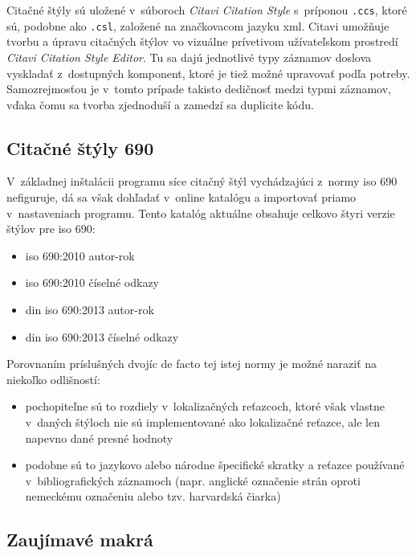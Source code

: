 \documentclass[
  color,
  table,
  nolof,
  oneside,
]{fithesis3}
\begin{document}
Citačné štýly sú uložené v~súboroch \emph{Citavi Citation Style} s~príponou \texttt{.ccs}, ktoré sú, podobne ako \texttt{.csl}, založené na značkovacom jazyku \gls{xml}. Citavi umožňuje tvorbu a úpravu citačných štýlov vo vizuálne prívetivom užívateľskom prostredí \emph{Citavi Citation Style Editor}. Tu sa dajú jednotlivé typy záznamov doslova vyskladať z~dostupných komponent, ktoré je tiež možné upravovať podľa potreby. Samozrejmosťou je v~tomto prípade takisto dedičnosť medzi typmi záznamov, vďaka čomu sa tvorba zjednoduší a zamedzí sa duplicite kódu.

\subsection{Citačné štýly  690}

V~základnej inštalácii programu síce citačný štýl vychádzajúci z~normy \gls{iso} 690 nefiguruje, dá sa však dohľadať v~online katalógu a importovať priamo v~nastaveniach programu. Tento katalóg aktuálne obsahuje celkovo štyri verzie štýlov pre \gls{iso} 690:

\begin{itemize}
\item \gls{iso} 690:2010 autor-rok
\item \gls{iso} 690:2010 číselné odkazy
\item \gls{din} \gls{iso} 690:2013 autor-rok
\item \gls{din} \gls{iso} 690:2013 číselné odkazy
\end{itemize}

Porovnaním príslušných dvojíc de facto tej istej normy je možné naraziť na niekoľko odlišností:

\begin{itemize}
\item pochopiteľne sú to rozdiely v~lokalizačných reťazcoch, ktoré však vlastne v~daných štýloch nie sú implementované ako lokalizačné reťazce, ale len napevno dané presné hodnoty
\item podobne sú to jazykovo alebo národne špecifické skratky a reťazce používané v~bibliografických záznamoch (napr. anglické označenie strán  oproti nemeckému označeniu  alebo tzv. harvardská čiarka)
\end{itemize}

\subsection{Zaujímavé makrá}
\end{document}

